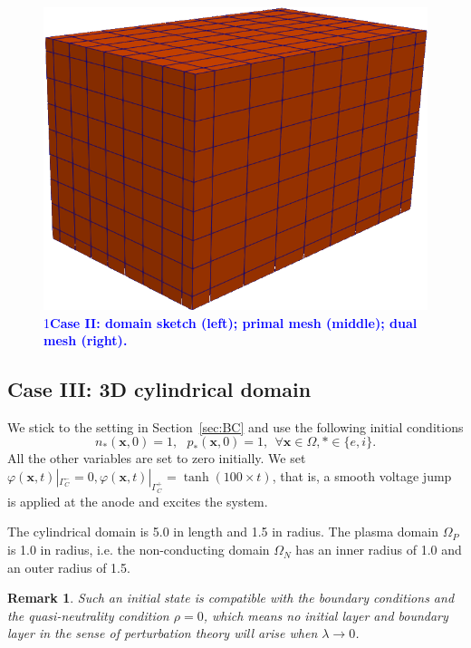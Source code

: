 \documentclass{article}
\newtheorem*{remark}{Remark}
\def\ifUpdate{1}
\newcommand{\review}[1]{\textcolor{blue}{\if\ifUpdate1\textbf{#1}\fi}}
\begin{document}
\begin{figure}
    \hspace{1cm}
    \includegraphics[scale=0.2]{paper_version/cube_mesh_dual.png}
    \caption{\review{Case II: domain sketch (left); primal mesh (middle); dual mesh (right).}}
    \label{fig:cube_domain_sketch}
\end{figure}


\subsection{Case III: 3D cylindrical domain}

We stick to the setting in Section~\ref{sec:BC} and use the following initial conditions
\begin{equation*}
    n_\ast(\mathbf{x}, 0) = 1, \ \ \  p_\ast(\mathbf{x},0) = 1, \ \ \forall \mathbf{x}\in\Omega, \ast \in \{e, i\}.
\end{equation*}
All the other variables are set to zero initially. We set $\varphi(\mathbf{x}, t)|_{\Gamma_C^-} = 0, \varphi(\mathbf{x}, t)|_{\Gamma_C^+} = \tanh(100\times t)$, that is, a smooth voltage jump is applied at the anode and excites the system. 

The cylindrical domain is 5.0 in length and 1.5 in radius. The plasma domain $\Omega_P$ is
1.0 in radius, i.e. the non-conducting domain $\Omega_N$ has an inner radius of 1.0 and an
outer radius of 1.5.

\begin{remark}
  Such an initial state is compatible with the boundary conditions and the quasi-neutrality
  condition $\rho = 0$, which means no initial layer and boundary layer in the sense of
  perturbation theory will arise when $\lambda \rightarrow 0$.
\end{remark}
\end{document}
